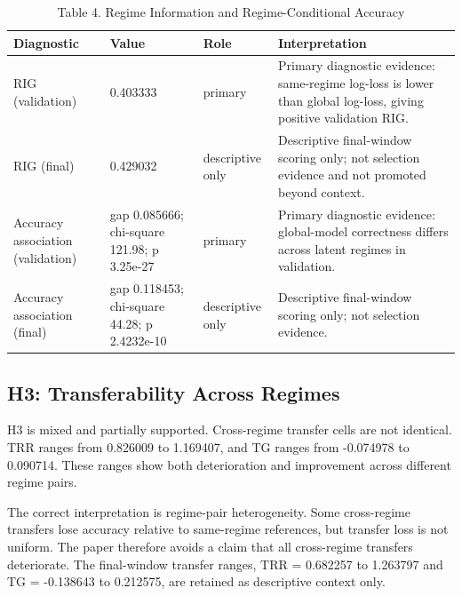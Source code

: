 \documentclass[12pt,a4paper]{article}
\begin{document}
\begin{table}[H]
\centering
\caption{Table 4. Regime Information and Regime-Conditional Accuracy}
\label{tab:rig-accuracy}
\small
\begin{adjustbox}{width=\textwidth}
\begin{tabular}{L{0.22\textwidth} L{0.24\textwidth} L{0.14\textwidth} L{0.35\textwidth}}
\toprule
Diagnostic & Value & Role & Interpretation \\
\midrule
RIG (validation) & 0.403333 & primary & Primary diagnostic evidence: same-regime log-loss is lower than global log-loss, giving positive validation RIG. \\
RIG (final) & 0.429032 & descriptive only & Descriptive final-window scoring only; not selection evidence and not promoted beyond context. \\
Accuracy association (validation) & gap 0.085666; chi-square 121.98; p 3.25e-27 & primary & Primary diagnostic evidence: global-model correctness differs across latent regimes in validation. \\
Accuracy association (final) & gap 0.118453; chi-square 44.28; p 2.4232e-10 & descriptive only & Descriptive final-window scoring only; not selection evidence. \\
\bottomrule
\end{tabular}
\end{adjustbox}
\end{table}

\subsection{H3: Transferability Across Regimes}

H3 is mixed and partially supported. Cross-regime transfer cells are not identical. TRR ranges from 0.826009 to 1.169407, and TG ranges from -0.074978 to 0.090714. These ranges show both deterioration and improvement across different regime pairs.

The correct interpretation is regime-pair heterogeneity. Some cross-regime transfers lose accuracy relative to same-regime references, but transfer loss is not uniform. The paper therefore avoids a claim that all cross-regime transfers deteriorate. The final-window transfer ranges, TRR = 0.682257 to 1.263797 and TG = -0.138643 to 0.212575, are retained as descriptive context only.
\end{document}

